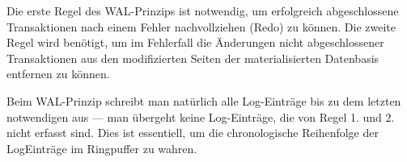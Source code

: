 \documentclass{lehramt-informatik-haupt}
\begin{document}
Die erste Regel des WAL-Prinzips ist notwendig, um erfolgreich
abgeschlossene Transaktionen nach einem Fehler nachvollziehen (Redo) zu
können. Die zweite Regel wird benötigt, um im Fehlerfall die Änderungen
nicht abgeschlossener Transaktionen aus den modifizierten Seiten der
materialisierten Datenbasis entfernen zu können.

Beim WAL-Prinzip schreibt man natürlich alle Log-Einträge bis zu dem
letzten notwendigen aus — \dh man übergeht keine Log-Einträge, die von
Regel 1. und 2. nicht erfasst sind. Dies ist essentiell, um die
chronologische Reihenfolge der LogEinträge im Ringpuffer zu wahren.

\literatur
\end{document}
